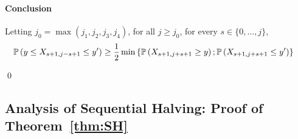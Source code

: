 \paragraph{Conclusion} Letting $j_0 = \max(j_1,j_2,j_3,j_4)$, for all $j\geq j_0$, for every $s \in \{0,\dots,j\}$,
\begin{align*}
&\mathbb{P}\left(y \leq X_{s+1,j-s+1} \leq y'\right) \geq \frac{1}{2}\min \left\{\mathbb{P}\left(X_{s+1,j+s+1} \geq y\right) ; \mathbb{P}\left(X_{s+1,j+s+1} \leq y'\right)\right\}
\end{align*}

\qed


\subsection{Analysis of Sequential Halving: Proof of Theorem~\ref{thm:SH}}
\label{sec:SHproof}

